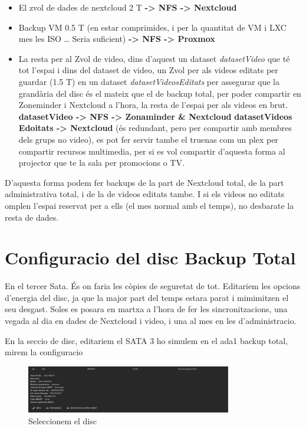 \documentclass[
  10pt,
]{krantz}
\providecommand{\tightlist}{%
  \setlength{\itemsep}{0pt}\setlength{\parskip}{0pt}}
\begin{document}
\begin{itemize}
\tightlist
\item
  El zvol de dades de nextcloud 2 T \textbf{-\textgreater{} NFS -\textgreater{} Nextcloud}
\item
  Backup VM 0.5 T (en estar comprimides, i per la quantitat de VM i LXC mes les ISO \ldots{} Seria suficient) \textbf{-\textgreater{} NFS -\textgreater{} Proxmox}
\item
  La resta per al Zvol de video, dins d'aquest un dataset \emph{datasetVideo} que té tot l'espai i dins del dataset de video, un Zvol per als videos editats per guardar (1.5 T) en un dataset \emph{datasetVideosEditats} per assegurar que la grandària del disc és el mateix que el de backup total, per poder compartir en Zoneminder i Nextcloud a l'hora, la resta de l'espai per als videos en brut.\\
  \textbf{datasetVideo -\textgreater{} NFS -\textgreater{} Zonaminder \& Nextcloud} \textbf{datasetVideos Edoitats -\textgreater{} Nextcloud} (és redundant, pero per compartir amb membres dels grups no video), es pot fer servir tambe el truenas com un plex per compartir recursos multimedia, per si es vol compartir d'aquesta forma al projector que te la sala per promocions o TV.
\end{itemize}

D'aquesta forma podem fer backups de la part de Nextcloud total, de la part administrativa total, i de la de videos editats tambe. I si els videos no editats omplen l'espai reservat per a ells (el mes normal amb el temps), no desbarate la resta de dades.

\hypertarget{configuracio-del-disc-backup-total}{%
\section{Configuracio del disc Backup Total}\label{configuracio-del-disc-backup-total}}

En el tercer Sata. És on faria les còpies de seguretat de tot. Editariem les opcions d'energia del disc, ja que la major part del temps estara parat i mimimitzen el seu desgast. Soles es posara en martxa a l'hora de fer les sincronitzacions, una vegada al dia en dades de Nextcloud i video, i una al mes en les d'administracio.

En la seccio de disc, editariem el SATA 3 ho simulem en el ada1 backup total, mirem la configuracio

\begin{figure}
\centering
\includegraphics[width=0.8\textwidth,height=\textheight]{imatges/proxmox/Conf_disc_ener1.png}
\caption{Seleccionem el disc}
\end{figure}
\end{document}
